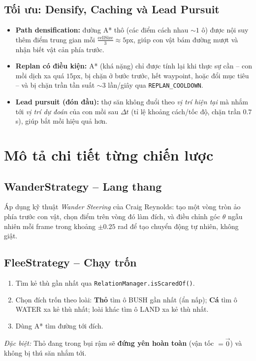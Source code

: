 \documentclass[12pt,a4paper]{report}
\newcommand{\keyword}[1]{\textcolor{primaryblue}{\textbf{#1}}}
\newcommand{\code}[1]{\texttt{\small #1}}
\begin{document}
\subsection{Tối ưu: Densify, Caching và Lead Pursuit}

\begin{itemize}[leftmargin=1.5em]
    \item \keyword{Path densification:} đường A* thô (các điểm cách nhau $\sim 1$ ô) được nội suy thêm điểm trung gian mỗi $\frac{\text{cellSize}}{3}\approx5$px, giúp con vật bám đường mượt và nhận biết vật cản phía trước.
    \item \keyword{Replan có điều kiện:} A* (khá nặng) chỉ được tính lại khi thực sự cần -- con mồi dịch xa quá $15$px, bị chặn ở bước trước, hết waypoint, hoặc đổi mục tiêu -- và bị chặn trần tần suất $\sim 3$ lần/giây qua \code{REPLAN\_COOLDOWN}.
    \item \keyword{Lead pursuit (đón đầu):} thợ săn không đuổi theo \textit{vị trí hiện tại} mà nhắm tới \textit{vị trí dự đoán} của con mồi sau $\Delta t$ (tỉ lệ khoảng cách/tốc độ, chặn trần $0.7$s), giúp bắt mồi hiệu quả hơn.
\end{itemize}

\section{Mô tả chi tiết từng chiến lược}

\subsection{WanderStrategy -- Lang thang}
Áp dụng kỹ thuật \textit{Wander Steering} của Craig Reynolds: tạo một vòng tròn ảo phía trước con vật, chọn điểm trên vòng đó làm đích, và điều chỉnh góc $\theta$ ngẫu nhiên mỗi frame trong khoảng $\pm0.25$ rad để tạo chuyển động tự nhiên, không giật.

\subsection{FleeStrategy -- Chạy trốn}
\begin{enumerate}[leftmargin=2em]
    \item Tìm kẻ thù gần nhất qua \code{RelationManager.isScaredOf()}.
    \item Chọn đích trốn theo loài: \textbf{Thỏ} tìm ô BUSH gần nhất (ẩn nấp); \textbf{Cá} tìm ô WATER xa kẻ thù nhất; loài khác tìm ô LAND xa kẻ thù nhất.
    \item Dùng A* tìm đường tới đích.
\end{enumerate}
\textit{Đặc biệt:} Thỏ đang trong bụi rậm sẽ \textbf{đứng yên hoàn toàn} (vận tốc $=\vec0$) và không bị thú săn nhắm tới.
\end{document}
